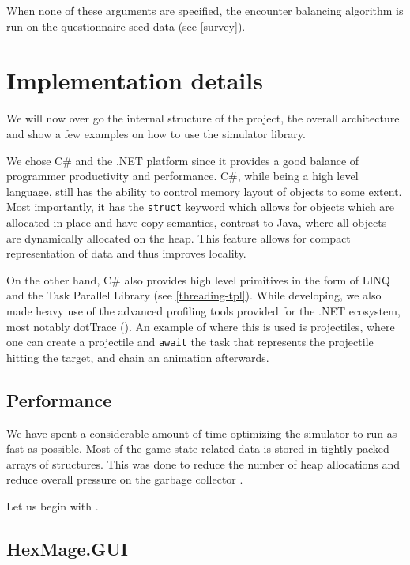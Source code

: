 When none of these arguments are specified, the encounter balancing algorithm is run on the questionnaire seed data (see \autoref{survey}).

\section{Implementation details}
\label{sec:impl-details}

We will now over go the internal structure of the project, the overall architecture and show a few examples on how to use the simulator library.

We chose C\# and the .NET platform since it provides a good balance of programmer productivity and performance. C\#, while being a high level language, still has the ability to control memory layout of objects to some extent. Most importantly, it has the \verb|struct| keyword which allows for objects which are allocated in-place and have copy semantics, contrast to Java, where all objects are dynamically allocated on the heap. This feature allows for compact representation of data and thus improves locality.

On the other hand, C\# also provides high level primitives in the form of LINQ and the Task Parallel Library \citep{tpl} (see \autoref{threading-tpl}). While developing, we also made heavy use of the advanced profiling tools provided for the .NET ecosystem, most notably dotTrace (\citet{dot-trace}). An example of where this is used is projectiles, where one can create a projectile and \verb|await| the task that represents the projectile hitting the target, and chain an animation afterwards.

\subsection{Performance}

We have spent a considerable amount of time optimizing the simulator to run as fast as possible. Most of the game state related data is stored in tightly packed arrays of structures. This was done to reduce the number of heap allocations and reduce overall pressure on the garbage collector \citep{highperf-dotnet}.



Let us begin with .

\subsection{HexMage.GUI}

